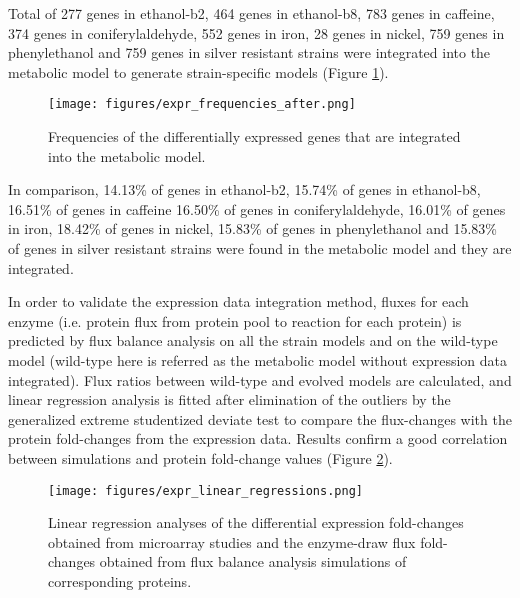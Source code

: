 Total of 277 genes in ethanol-b2, 464 genes in ethanol-b8, 783 genes in caffeine, 374 genes in coniferylaldehyde, 552 genes in iron, 28 genes in nickel, 759 genes in phenylethanol and 759 genes in silver resistant strains were integrated into the metabolic model to generate strain-specific models (Figure \ref{fig:expr_frequencies_after}).

\begin{figure}[H]
  \begin{center}
  \texttt{[image: figures/expr\_frequencies\_after.png]}
  \caption[Frequencies of the differentially expressed genes that are integrated into the metabolic model]{Frequencies of the differentially expressed genes that are integrated into the metabolic model.}
  \label{fig:expr_frequencies_after}
  \end{center}
\end{figure}

In comparison, 14.13\% of genes in ethanol-b2, 15.74\% of genes in ethanol-b8, 16.51\% of genes in caffeine	16.50\% of genes in coniferylaldehyde, 16.01\% of genes in iron, 18.42\% of genes	in nickel, 15.83\% of genes in phenylethanol and 15.83\%  of genes in silver resistant strains were found in the metabolic model and they are integrated.

In order to validate the expression data integration method, fluxes for each enzyme (i.e. protein flux from protein pool to reaction for each protein) is predicted by flux balance analysis on all the strain models and on the wild-type model (wild-type here is referred as the metabolic model without expression data integrated). Flux ratios between wild-type and evolved models are calculated, and linear regression analysis is fitted after elimination of the outliers by the generalized extreme studentized deviate test to compare the flux-changes with the protein fold-changes from the expression data. Results confirm a good correlation between simulations and protein fold-change values (Figure \ref{fig:expr_linear_regressions}).

\begin{figure}[H]
  \begin{center}
  \texttt{[image: figures/expr\_linear\_regressions.png]}
  \caption[Linear regression analyses of the fold-changes]{Linear regression analyses of the differential expression fold-changes obtained from microarray studies and the enzyme-draw flux fold-changes obtained from flux balance analysis simulations of corresponding proteins.}
  \label{fig:expr_linear_regressions}
  \end{center}
\end{figure}


